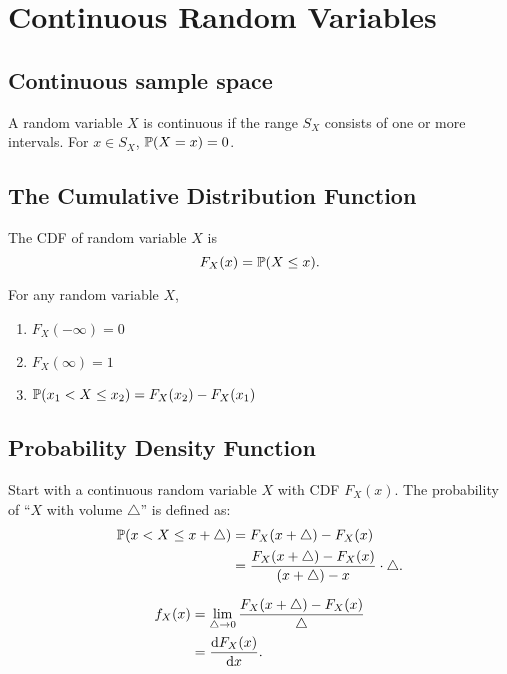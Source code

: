 \chapter{Continuous Random Variables}


\section{Continuous sample space}
\begin{axiom}
    A random variable $X$ is continuous if the range $S_X$ consists of one or more intervals. For $x\in S_X$, $\P{X=x}=0$.
\end{axiom}


\section{The Cumulative Distribution Function}
\begin{definition}
    The CDF of random variable $X$ is
    \[F_X(x) = \P{X\leq x}.\]
\end{definition}

\begin{theorem}
    For any random variable $X$,
    \begin{enumerate}
        \item $F_X(-\infty)=0$
        \item $F_X(\infty)=1$
        \item $\P{x_1<X\leq x_2} = F_X(x_2)-F_X(x_1)$
    \end{enumerate}
\end{theorem}


\section{Probability Density Function}
Start with a continuous random variable $X$ with CDF $F_X(x)$. The probability of ``$X$ with volume $\triangle$'' is defined as:
\begin{align*}
    \P{x<X\leq x+\triangle}
    &= F_X(x+\triangle)-F_X(x) \\
    &= \frac{F_X(x+\triangle)-F_X(x)}{(x+\triangle)-x}\cdot\triangle.
\end{align*}
\begin{definition}
    \begin{align*}
        f_X(x)
        &= \lim_{\triangle\rightarrow 0}\frac{F_X(x+\triangle)-F_X(x)}{\triangle} \\
        &= \frac{\mathop{}\!\mathrm{d} F_X(x)}{\mathop{}\!\mathrm{d} x}.
    \end{align*}
\end{definition}

